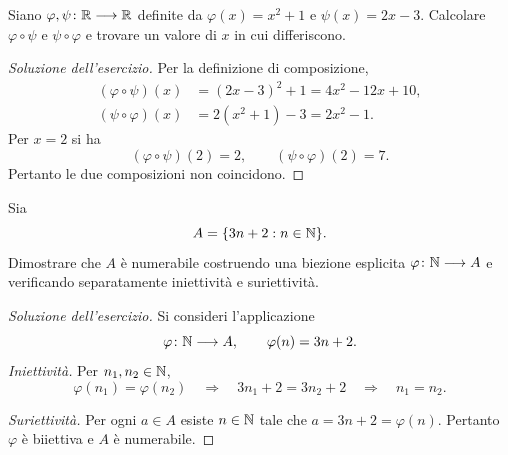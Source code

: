 \begin{exercise}
\label{ex:fondamenti-ordine-composizioni}
Siano $\varphi,\psi\colon\mathbb{R}\longrightarrow\mathbb{R}$ definite da
$\varphi(x)=x^2+1$ e $\psi(x)=2x-3$.
Calcolare $\varphi\circ\psi$ e $\psi\circ\varphi$ e trovare
un valore di $x$ in cui differiscono.
\end{exercise}
\begin{proof}[Soluzione dell'esercizio]
Per la definizione di composizione,
\[
\begin{aligned}
  (\varphi\circ\psi)(x)
    &=(2x-3)^2+1=4x^2-12x+10,\\
  (\psi\circ\varphi)(x)
    &=2(x^2+1)-3=2x^2-1.
\end{aligned}
\]
Per $x=2$ si ha
\[
  (\varphi\circ\psi)(2)=2,
  \qquad (\psi\circ\varphi)(2)=7.
\]
Pertanto le due composizioni non coincidono.
\end{proof}

\begin{exercise}
\label{ex:fondamenti-classe-naturali-numerabile}
Sia
\[
  A=\{3n+2:n\in\mathbb{N}\}.
\]
Dimostrare che $A$ è numerabile costruendo una biezione esplicita
$\varphi\colon\mathbb{N}\longrightarrow A$ e verificando separatamente
iniettività e suriettività.
\end{exercise}
\begin{proof}[Soluzione dell'esercizio]
Si consideri l'applicazione
\[
  \varphi\colon\mathbb{N}\longrightarrow A,
  \qquad \varphi(n)=3n+2.
\]
\emph{Iniettività.} Per $n_1,n_2\in\mathbb{N}$,
\[
  \varphi(n_1)=\varphi(n_2)
  \quad\Longrightarrow\quad
  3n_1+2=3n_2+2
  \quad\Longrightarrow\quad n_1=n_2.
\]

\emph{Suriettività.} Per ogni $a\in A$ esiste $n\in\mathbb{N}$
tale che $a=3n+2=\varphi(n)$.
Pertanto $\varphi$ è biiettiva e $A$ è numerabile.
\end{proof}

\clearpage

